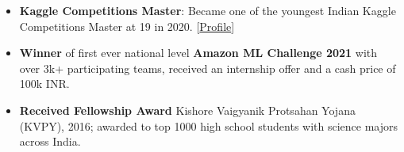 \vspace{2mm}
\begin{itemize}
	\setlength\itemsep{0.3em}    
    \item {\textbf{Kaggle Competitions Master}: Became one of the youngest Indian Kaggle Competitions Master at 19 in 2020. [\href{https://www.kaggle.com/carnav0400/competitions}{Profile}]}
    \item
    {\textbf{Winner} of first ever national level \textbf{Amazon ML Challenge 2021} with over 3k+ participating teams, received an internship offer and a cash price of 100k INR.}
    \item 
        {\textbf{Received Fellowship Award} Kishore Vaigyanik Protsahan Yojana (KVPY), 2016; awarded to top 1000 high school students with science majors across India.}

\end{itemize}    

